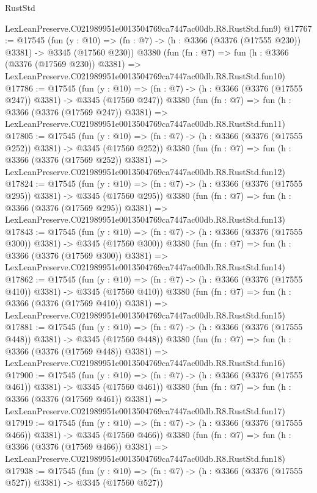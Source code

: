 \begin{lexlean}{RustStd}
\begin{coremodule}
    LexLeanPreserve.C021989951e0013504769ca7447ac00db.R8.RustStd.fun9)
@17767 := @17545
    (fun (y : @10) => (fn : @7) -> (h : @3366 (@3376 (@17555 @230)) @3381) -> @3345 (@17560 @230))
    @3380
    (fun (fn : @7) =>
    fun (h : @3366 (@3376 (@17569 @230)) @3381) =>
    LexLeanPreserve.C021989951e0013504769ca7447ac00db.R8.RustStd.fun10)
@17786 := @17545
    (fun (y : @10) => (fn : @7) -> (h : @3366 (@3376 (@17555 @247)) @3381) -> @3345 (@17560 @247))
    @3380
    (fun (fn : @7) =>
    fun (h : @3366 (@3376 (@17569 @247)) @3381) =>
    LexLeanPreserve.C021989951e0013504769ca7447ac00db.R8.RustStd.fun11)
@17805 := @17545
    (fun (y : @10) => (fn : @7) -> (h : @3366 (@3376 (@17555 @252)) @3381) -> @3345 (@17560 @252))
    @3380
    (fun (fn : @7) =>
    fun (h : @3366 (@3376 (@17569 @252)) @3381) =>
    LexLeanPreserve.C021989951e0013504769ca7447ac00db.R8.RustStd.fun12)
@17824 := @17545
    (fun (y : @10) => (fn : @7) -> (h : @3366 (@3376 (@17555 @295)) @3381) -> @3345 (@17560 @295))
    @3380
    (fun (fn : @7) =>
    fun (h : @3366 (@3376 (@17569 @295)) @3381) =>
    LexLeanPreserve.C021989951e0013504769ca7447ac00db.R8.RustStd.fun13)
@17843 := @17545
    (fun (y : @10) => (fn : @7) -> (h : @3366 (@3376 (@17555 @300)) @3381) -> @3345 (@17560 @300))
    @3380
    (fun (fn : @7) =>
    fun (h : @3366 (@3376 (@17569 @300)) @3381) =>
    LexLeanPreserve.C021989951e0013504769ca7447ac00db.R8.RustStd.fun14)
@17862 := @17545
    (fun (y : @10) => (fn : @7) -> (h : @3366 (@3376 (@17555 @410)) @3381) -> @3345 (@17560 @410))
    @3380
    (fun (fn : @7) =>
    fun (h : @3366 (@3376 (@17569 @410)) @3381) =>
    LexLeanPreserve.C021989951e0013504769ca7447ac00db.R8.RustStd.fun15)
@17881 := @17545
    (fun (y : @10) => (fn : @7) -> (h : @3366 (@3376 (@17555 @448)) @3381) -> @3345 (@17560 @448))
    @3380
    (fun (fn : @7) =>
    fun (h : @3366 (@3376 (@17569 @448)) @3381) =>
    LexLeanPreserve.C021989951e0013504769ca7447ac00db.R8.RustStd.fun16)
@17900 := @17545
    (fun (y : @10) => (fn : @7) -> (h : @3366 (@3376 (@17555 @461)) @3381) -> @3345 (@17560 @461))
    @3380
    (fun (fn : @7) =>
    fun (h : @3366 (@3376 (@17569 @461)) @3381) =>
    LexLeanPreserve.C021989951e0013504769ca7447ac00db.R8.RustStd.fun17)
@17919 := @17545
    (fun (y : @10) => (fn : @7) -> (h : @3366 (@3376 (@17555 @466)) @3381) -> @3345 (@17560 @466))
    @3380
    (fun (fn : @7) =>
    fun (h : @3366 (@3376 (@17569 @466)) @3381) =>
    LexLeanPreserve.C021989951e0013504769ca7447ac00db.R8.RustStd.fun18)
@17938 := @17545
    (fun (y : @10) => (fn : @7) -> (h : @3366 (@3376 (@17555 @527)) @3381) -> @3345 (@17560 @527))

\end{coremodule}
\end{lexlean}
